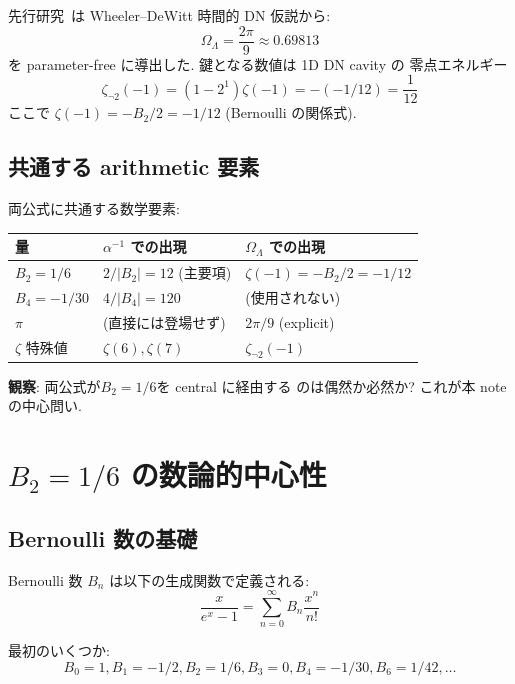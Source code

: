\documentclass[11pt,a4paper]{article}
\begin{document}
先行研究~\cite{WDW-DN-paper}は Wheeler--DeWitt 時間的 DN 仮説から:
\begin{equation}\label{eq:omega-formula}
\Omega_\Lambda = \frac{2\pi}{9} \approx 0.69813
\end{equation}
を parameter-free に導出した. 鍵となる数値は 1D DN cavity の
零点エネルギー
\begin{equation}
\zeta_{\neg 2}(-1) = (1 - 2^1)\zeta(-1) = -(-1/12) = \frac{1}{12}
\end{equation}
ここで $\zeta(-1) = -B_2/2 = -1/12$ (Bernoulli の関係式).

\subsection{共通する arithmetic 要素}

両公式に共通する数学要素:

\begin{center}
\begin{tabular}{lll}
\toprule
量 & $\alpha^{-1}$ での出現 & $\Omega_\Lambda$ での出現 \\
\midrule
$B_2 = 1/6$ & $2/|B_2| = 12$ (主要項)
& $\zeta(-1) = -B_2/2 = -1/12$ \\
$B_4 = -1/30$ & $4/|B_4| = 120$
& (使用されない) \\
$\pi$ & (直接には登場せず) & $2\pi/9$ (explicit) \\
$\zeta$ 特殊値 & $\zeta(6), \zeta(7)$ & $\zeta_{\neg 2}(-1)$ \\
\bottomrule
\end{tabular}
\end{center}

\textbf{観察}: 両公式が\textbf{$B_2 = 1/6$}を central に経由する
のは偶然か必然か? これが本 note の中心問い.

\section{$B_2 = 1/6$ の数論的中心性}

\subsection{Bernoulli 数の基礎}

Bernoulli 数 $B_n$ は以下の生成関数で定義される:
\begin{equation}
\frac{x}{e^x - 1} = \sum_{n=0}^\infty B_n \frac{x^n}{n!}
\end{equation}

最初のいくつか:
$$B_0 = 1, B_1 = -1/2, B_2 = 1/6, B_3 = 0, B_4 = -1/30, B_6 = 1/42, \ldots$$
\end{document}
